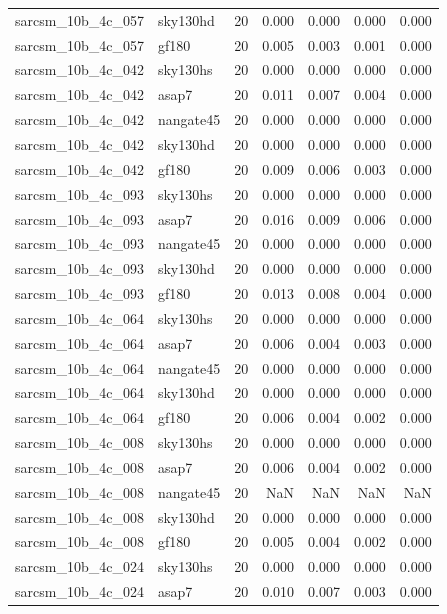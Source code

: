 \begin{tabular}{llrrrrr}
sarcsm\_10b\_4c\_057 & sky130hd & 20 & 0.000 & 0.000 & 0.000 & 0.000 \\
sarcsm\_10b\_4c\_057 & gf180 & 20 & 0.005 & 0.003 & 0.001 & 0.000 \\
sarcsm\_10b\_4c\_042 & sky130hs & 20 & 0.000 & 0.000 & 0.000 & 0.000 \\
sarcsm\_10b\_4c\_042 & asap7 & 20 & 0.011 & 0.007 & 0.004 & 0.000 \\
sarcsm\_10b\_4c\_042 & nangate45 & 20 & 0.000 & 0.000 & 0.000 & 0.000 \\
sarcsm\_10b\_4c\_042 & sky130hd & 20 & 0.000 & 0.000 & 0.000 & 0.000 \\
sarcsm\_10b\_4c\_042 & gf180 & 20 & 0.009 & 0.006 & 0.003 & 0.000 \\
sarcsm\_10b\_4c\_093 & sky130hs & 20 & 0.000 & 0.000 & 0.000 & 0.000 \\
sarcsm\_10b\_4c\_093 & asap7 & 20 & 0.016 & 0.009 & 0.006 & 0.000 \\
sarcsm\_10b\_4c\_093 & nangate45 & 20 & 0.000 & 0.000 & 0.000 & 0.000 \\
sarcsm\_10b\_4c\_093 & sky130hd & 20 & 0.000 & 0.000 & 0.000 & 0.000 \\
sarcsm\_10b\_4c\_093 & gf180 & 20 & 0.013 & 0.008 & 0.004 & 0.000 \\
sarcsm\_10b\_4c\_064 & sky130hs & 20 & 0.000 & 0.000 & 0.000 & 0.000 \\
sarcsm\_10b\_4c\_064 & asap7 & 20 & 0.006 & 0.004 & 0.003 & 0.000 \\
sarcsm\_10b\_4c\_064 & nangate45 & 20 & 0.000 & 0.000 & 0.000 & 0.000 \\
sarcsm\_10b\_4c\_064 & sky130hd & 20 & 0.000 & 0.000 & 0.000 & 0.000 \\
sarcsm\_10b\_4c\_064 & gf180 & 20 & 0.006 & 0.004 & 0.002 & 0.000 \\
sarcsm\_10b\_4c\_008 & sky130hs & 20 & 0.000 & 0.000 & 0.000 & 0.000 \\
sarcsm\_10b\_4c\_008 & asap7 & 20 & 0.006 & 0.004 & 0.002 & 0.000 \\
sarcsm\_10b\_4c\_008 & nangate45 & 20 & NaN & NaN & NaN & NaN \\
sarcsm\_10b\_4c\_008 & sky130hd & 20 & 0.000 & 0.000 & 0.000 & 0.000 \\
sarcsm\_10b\_4c\_008 & gf180 & 20 & 0.005 & 0.004 & 0.002 & 0.000 \\
sarcsm\_10b\_4c\_024 & sky130hs & 20 & 0.000 & 0.000 & 0.000 & 0.000 \\
sarcsm\_10b\_4c\_024 & asap7 & 20 & 0.010 & 0.007 & 0.003 & 0.000 \\

\end{tabular}
